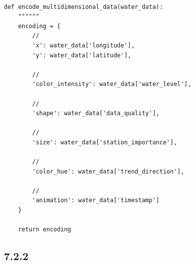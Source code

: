 \hypertarget{section-111}{%
\paragraph{}\label{section-111}}

\begin{lstlisting}[style=python]
def encode_multidimensional_data(water_data):
    """"""
    encoding = {
        // 
        'x': water_data['longitude'],
        'y': water_data['latitude'],
        
        // 
        'color_intensity': water_data['water_level'],
        
        // 
        'shape': water_data['data_quality'],
        
        // 
        'size': water_data['station_importance'],
        
        // 
        'color_hue': water_data['trend_direction'],
        
        // 
        'animation': water_data['timestamp']
    }
    
    return encoding
\end{lstlisting}

\hypertarget{section-112}{%
\subsection{7.2.2}\label{section-112}}

\hypertarget{section-113}{%
\subsubsection{}\label{section-113}}

\hypertarget{section-114}{%
\paragraph{}\label{section-114}}

